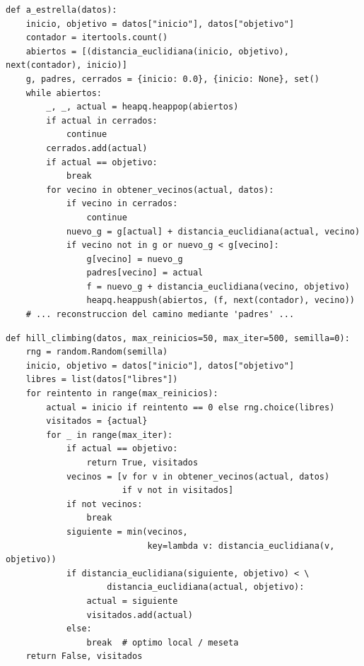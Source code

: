 \documentclass[12pt,a4paper]{article}
\begin{document}
\begin{verbatim}
def a_estrella(datos):
    inicio, objetivo = datos["inicio"], datos["objetivo"]
    contador = itertools.count()
    abiertos = [(distancia_euclidiana(inicio, objetivo), next(contador), inicio)]
    g, padres, cerrados = {inicio: 0.0}, {inicio: None}, set()
    while abiertos:
        _, _, actual = heapq.heappop(abiertos)
        if actual in cerrados:
            continue
        cerrados.add(actual)
        if actual == objetivo:
            break
        for vecino in obtener_vecinos(actual, datos):
            if vecino in cerrados:
                continue
            nuevo_g = g[actual] + distancia_euclidiana(actual, vecino)
            if vecino not in g or nuevo_g < g[vecino]:
                g[vecino] = nuevo_g
                padres[vecino] = actual
                f = nuevo_g + distancia_euclidiana(vecino, objetivo)
                heapq.heappush(abiertos, (f, next(contador), vecino))
    # ... reconstruccion del camino mediante 'padres' ...
\end{verbatim}

\begin{verbatim}
def hill_climbing(datos, max_reinicios=50, max_iter=500, semilla=0):
    rng = random.Random(semilla)
    inicio, objetivo = datos["inicio"], datos["objetivo"]
    libres = list(datos["libres"])
    for reintento in range(max_reinicios):
        actual = inicio if reintento == 0 else rng.choice(libres)
        visitados = {actual}
        for _ in range(max_iter):
            if actual == objetivo:
                return True, visitados
            vecinos = [v for v in obtener_vecinos(actual, datos)
                       if v not in visitados]
            if not vecinos:
                break
            siguiente = min(vecinos,
                            key=lambda v: distancia_euclidiana(v, objetivo))
            if distancia_euclidiana(siguiente, objetivo) < \
                    distancia_euclidiana(actual, objetivo):
                actual = siguiente
                visitados.add(actual)
            else:
                break  # optimo local / meseta
    return False, visitados
\end{verbatim}
\end{document}

